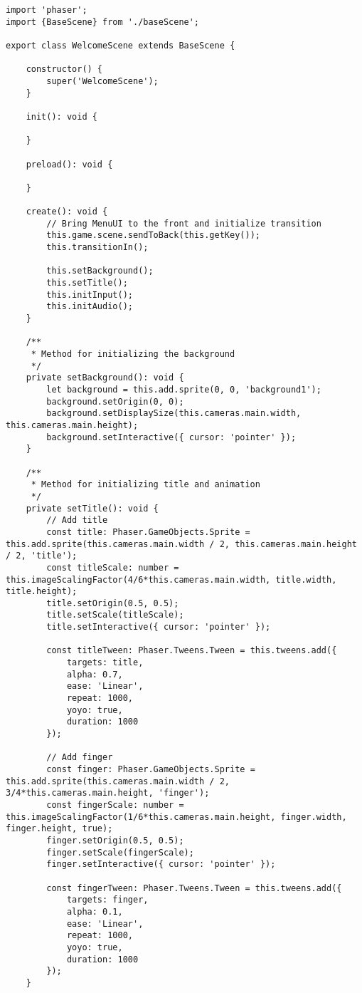 \begin{lstlisting}[style=TypeScript, caption={}]
import 'phaser';
import {BaseScene} from './baseScene';

export class WelcomeScene extends BaseScene {

    constructor() {
        super('WelcomeScene');
    }

    init(): void {

    }

    preload(): void {

    }

    create(): void {
        // Bring MenuUI to the front and initialize transition
        this.game.scene.sendToBack(this.getKey());
        this.transitionIn();

        this.setBackground();
        this.setTitle();
        this.initInput();
        this.initAudio();
    }

    /**
     * Method for initializing the background
     */
    private setBackground(): void {
        let background = this.add.sprite(0, 0, 'background1');
        background.setOrigin(0, 0);
        background.setDisplaySize(this.cameras.main.width, this.cameras.main.height);
        background.setInteractive({ cursor: 'pointer' });
    }

    /**
     * Method for initializing title and animation
     */
    private setTitle(): void {
        // Add title
        const title: Phaser.GameObjects.Sprite = this.add.sprite(this.cameras.main.width / 2, this.cameras.main.height / 2, 'title');
        const titleScale: number = this.imageScalingFactor(4/6*this.cameras.main.width, title.width, title.height);
        title.setOrigin(0.5, 0.5);
        title.setScale(titleScale);
        title.setInteractive({ cursor: 'pointer' });

        const titleTween: Phaser.Tweens.Tween = this.tweens.add({
            targets: title,
            alpha: 0.7,
            ease: 'Linear',
            repeat: 1000,
            yoyo: true,
            duration: 1000
        });

        // Add finger
        const finger: Phaser.GameObjects.Sprite = this.add.sprite(this.cameras.main.width / 2, 3/4*this.cameras.main.height, 'finger');
        const fingerScale: number = this.imageScalingFactor(1/6*this.cameras.main.height, finger.width, finger.height, true);
        finger.setOrigin(0.5, 0.5);
        finger.setScale(fingerScale);
        finger.setInteractive({ cursor: 'pointer' });

        const fingerTween: Phaser.Tweens.Tween = this.tweens.add({
            targets: finger,
            alpha: 0.1,
            ease: 'Linear',
            repeat: 1000,
            yoyo: true,
            duration: 1000
        });
    }


\end{lstlisting}
